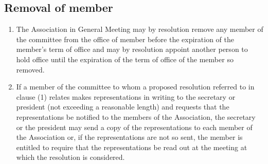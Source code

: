 \subsection{Removal of member}
\begin{enumerate}
  \item The Association in General Meeting may by resolution remove any member of the committee from the office of member before the expiration of the member’s term of office and may by resolution appoint another person to hold office until the expiration of the term of office of the member so removed.
  \item If a member of the committee to whom a proposed resolution referred to in clause (1) relates makes representations in writing to the secretary or president (not exceeding a reasonable length) and requests that the representations be notified to the members of the Association, the secretary or the president may send a copy of the representations to each member of the Association or, if the representations are not so sent, the member is entitled to require that the representations be read out at the meeting at which the resolution is considered.
\end{enumerate}
